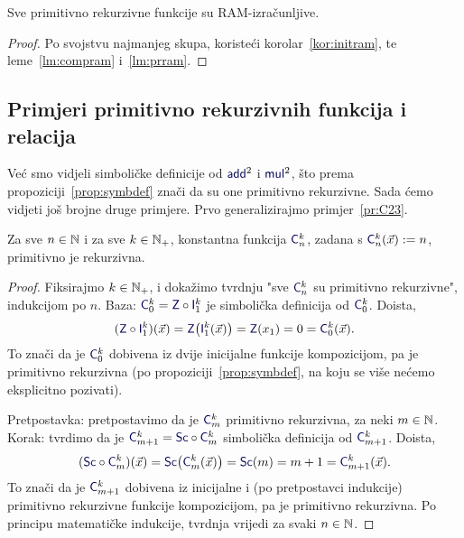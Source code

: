 \begin{propozicija}[{name=[RAM-izračunljivost primitivno rekurzivnih funkcija]}]\label{prop:prnram}
Sve primitivno rekurzivne funkcije su RAM-izračunljive.
\end{propozicija}
\begin{proof}
Po svojstvu najmanjeg skupa, koristeći korolar~\ref{kor:initram}, te leme~\ref{lm:compram} i~\ref{lm:prram}.
\end{proof}

\subsection{Primjeri primitivno rekurzivnih funkcija i relacija}

Već smo vidjeli simboličke definicije od $\f{add}^2$ i $\f{mul}^2$, što prema propoziciji~\ref{prop:symbdef} znači da su one primitivno rekurzivne. Sada ćemo vidjeti još brojne druge primjere. Prvo generalizirajmo primjer~\ref{pr:C23}.

\begin{propozicija}[{name=[primitivna rekurzivnost konstantnih funkcija]}]\label{prop:konst}
Za sve $n\in{\mathbb N}$ i za sve $k\in{\mathbb N}_+$, konstantna funkcija $\f C_n^k$, zadana s $\f C_n^k(\vec x):=n$, primitivno je rekurzivna.
\end{propozicija}
\begin{proof}
Fiksirajmo $k\in{\mathbb N}_+$, i dokažimo tvrdnju "sve $\f C_n^k$ su primitivno rekurzivne", indukcijom po $n$. Baza: $\f C_0^k=\f Z\circ\f I_1^k$ je simbolička definicija od $\f C_0^k$. Doista,
\begin{equation}
    (\f Z\circ\f I_1^k)(\vec x)=\f Z\bigl(\f I_1^k(\vec x)\bigr)=\f Z(x_1)=0=\f C_0^k(\vec x)\text.
\end{equation}
To znači da je $\f C_0^k$ dobivena iz dvije inicijalne funkcije kompozicijom, pa je primitivno rekurzivna (po propoziciji~\ref{prop:symbdef}, na koju se više nećemo eksplicitno pozivati).

Pretpostavka: pretpostavimo da je $\f C_m^k$ primitivno rekurzivna, za neki $m\in{\mathbb N}$. 
Korak: tvrdimo da je $\f C_{m+1}^k=\f{Sc}\circ\f C_m^k$ simbolička definicija od $\f C_{m+1}^k$. Doista,
\begin{equation}
    (\f{Sc}\circ\f C_m^k)(\vec x)=\f{Sc}\bigl(\f C_m^k(\vec x)\bigr)=\f{Sc}(m)=m+1=\f C_{m+1}^k(\vec x)\text.
\end{equation}
To znači da je $\f C_{m+1}^k$ dobivena iz inicijalne i (po pretpostavci indukcije) primitivno rekurzivne funkcije kompozicijom, pa je primitivno rekurzivna. Po principu matematičke indukcije, tvrdnja vrijedi za svaki $n\in{\mathbb N}$.
\end{proof}

